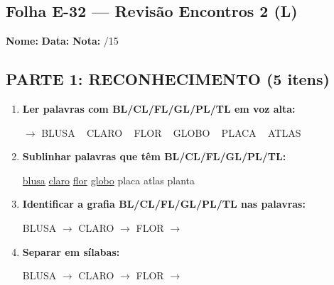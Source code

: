 \subsection{Folha E-32 --- Revisão Encontros 2 (L)}
\begin{exercicio}



\noindent\textbf{Nome:} \underline{\hspace{3.2cm}} \quad \textbf{Data:} \underline{\hspace{1.6cm}} \quad \textbf{Nota:} \underline{\hspace{0.9cm}}/15


\subsection*{PARTE 1: RECONHECIMENTO (5 itens)}

\begin{enumerate}

  \item \textbf{Ler palavras com BL/CL/FL/GL/PL/TL em voz alta:}
  \begin{center}
  $\rightarrow$ BLUSA ~ CLARO ~ FLOR ~ GLOBO ~ PLACA ~ ATLAS
  \end{center}

  \item \textbf{Sublinhar palavras que têm BL/CL/FL/GL/PL/TL:}

\begin{center}
  \uline{blusa} \quad \uline{claro} \quad \uline{flor} \quad \uline{globo} \quad placa \quad atlas \quad planta
\end{center}

  \item \textbf{Identificar a grafia BL/CL/FL/GL/PL/TL nas palavras:}
  \begin{center}
  BLUSA $\rightarrow$ \underline{\hspace{1cm}} \quad CLARO $\rightarrow$ \underline{\hspace{1cm}} \quad FLOR $\rightarrow$ \underline{\hspace{1cm}}
  \end{center}

  \item \textbf{Separar em sílabas:}
  \begin{center}
  BLUSA $\rightarrow$ \underline{\hspace{1.2cm}} \quad CLARO $\rightarrow$ \underline{\hspace{1.2cm}} \quad FLOR $\rightarrow$ \underline{\hspace{1.2cm}}
  \end{center}


\end{enumerate}
\end{exercicio}
